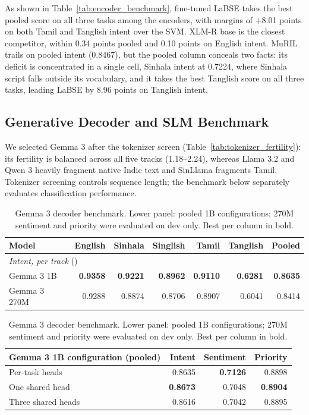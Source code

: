 As shown in Table~\ref{tab:encoder_benchmark}, fine-tuned LaBSE takes the best pooled score on all three tasks among the encoders, with margins of +8.01 points on both Tamil and Tanglish intent over the SVM. XLM-R base is the closest competitor, within 0.34 points pooled and 0.10 points on English intent. MuRIL trails on pooled intent (0.8467), but the pooled column conceals two facts: its deficit is concentrated in a single cell, Sinhala intent at 0.7224, where Sinhala script falls outside its vocabulary, and it takes the best Tanglish score on all three tasks, leading LaBSE by 8.96 points on Tanglish intent. 

\subsection{Generative Decoder and SLM Benchmark}

We selected Gemma 3 after the tokenizer screen (Table~\ref{tab:tokenizer_fertility}): its fertility is balanced across all five tracks (1.18--2.24), whereas Llama 3.2 and Qwen 3 heavily fragment native Indic text and SinLlama fragments Tamil. Tokenizer screening controls sequence length; the benchmark below separately evaluates classification performance.

\begin{table}[!htbp]
\caption{Gemma 3 decoder benchmark. Lower panel: pooled 1B configurations;
270M sentiment and priority were evaluated on dev only. Best per column in bold.}
\label{tab:decoder_benchmark}
\centering
\scriptsize
\setlength{\tabcolsep}{3.2pt}
\begin{tabular}{@{}lrrrrrr@{}}
\toprule
Model & English & Sinhala & Singlish & Tamil & Tanglish & Pooled \\
\midrule
\multicolumn{7}{l}{\textit{Intent, per track} (\macrof{})} \\
Gemma 3 1B   & \textbf{0.9358} & \textbf{0.9221} & \textbf{0.8962} & \textbf{0.9110} & \textbf{0.6281} & \textbf{0.8635} \\
Gemma 3 270M & 0.9288 & 0.8874 & 0.8706 & 0.8907 & 0.6041 & 0.8414 \\
\bottomrule
\end{tabular}

\vspace{4pt}
\begin{tabular}{@{}lrrr@{}}
\toprule
Gemma 3 1B configuration (pooled) & Intent & Sentiment & Priority \\
\midrule
Per-task heads    & 0.8635 & \textbf{0.7126} & 0.8898 \\
One shared head   & \textbf{0.8673} & 0.7048 & \textbf{0.8904} \\
Three shared heads & 0.8616 & 0.7042 & 0.8895 \\
\bottomrule
\end{tabular}
\end{table}

